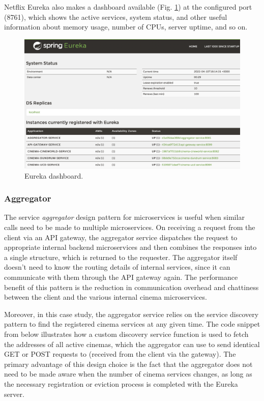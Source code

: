 Netflix Eureka also makes a dashboard available (Fig. \ref{fig:eureka-dashboard}) at the configured port (8761), which shows the active services, system status, and other useful information about memory usage, number of CPUs, server uptime, and so on.

\begin{figure}[H]
  \centering
  \includegraphics[width=1.0\linewidth]{./assets/images/case-studies/eureka-dashboard.png}
  \caption{Eureka dashboard.}
  \label{fig:eureka-dashboard}
\end{figure}

\subsubsection{Aggregator}

The service \textit{aggregator} design pattern for microservices is useful when similar calls need to be made to multiple microservices. On receiving a request from the client via an API gateway, the aggregator service dispatches the request to appropriate internal backend microservices and then combines the responses into a single structure, which is returned to the requester. The aggregator itself doesn't need to know the routing details of internal services, since it can communicate with them through the API gateway again. The performance benefit of this pattern is the reduction in communication overhead and chattiness between the client and the various internal cinema microservices.

Moreover, in this case study, the aggregator service relies on the service discovery pattern to find the registered cinema services at any given time. The code snippet from  below illustrates how a custom discovery service function is used to fetch the addresses of all active cinemas, which the aggregator can use to send identical GET or POST requests to (received from the client via the gateway). The primary advantage of this design choice is the fact that the aggregator does not need to be made aware when the number of cinema services changes, as long as the necessary registration or eviction process is completed with the Eureka server.

